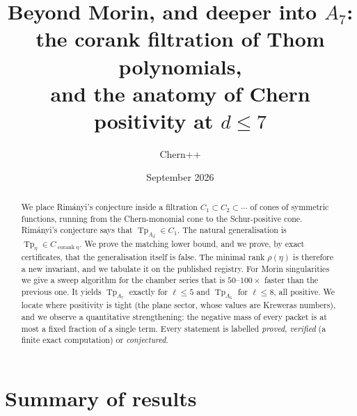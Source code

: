 \documentclass[11pt,a4paper]{article}
\title{\textbf{Beyond Morin, and deeper into $A_7$}:\\[2pt]
       the corank filtration of Thom polynomials,\\ and the anatomy of Chern positivity at $d \le 7$}
\author{Chern++}
\date{September 2026}
\DeclareMathOperator{\Tp}{Tp}
\theoremstyle{plain}
\theoremstyle{definition}
\theoremstyle{remark}
\begin{document}
\maketitle

\begin{abstract}
We place Rim\'anyi's conjecture inside a filtration $C_1 \subset C_2 \subset \cdots$ of cones of
symmetric functions, running from the Chern-monomial cone to the Schur-positive cone. Rim\'anyi's
conjecture says that $\Tp_{A_d} \in C_1$. The natural generalisation is $\Tp_\eta \in
C_{\operatorname{corank}\eta}$. We prove the matching lower bound, and we prove, by exact
certificates, that the generalisation itself is false. The minimal rank $\rho(\eta)$ is therefore a
new invariant, and we tabulate it on the published registry. For Morin singularities we give a
sweep algorithm for the chamber series that is $50$--$100\times$ faster than the previous one. It
yields $\Tp_{A_7}$ exactly for $\ell \le 5$ and $\Tp_{A_6}$ for $\ell \le 8$, all positive. We
locate where positivity is tight (the plane sector, whose values are Kreweras numbers), and we
observe a quantitative strengthening: the negative mass of every packet is at most a fixed
fraction of a single term. Every statement is labelled \emph{proved}, \emph{verified} (a finite
exact computation) or \emph{conjectured}.
\end{abstract}

\section*{Summary of results}
\end{document}
